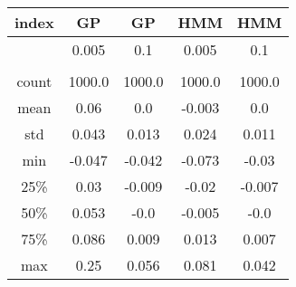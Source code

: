 \centering \begin{tabular}{c|c|c|c|c}
index	&GP	&GP	&HMM	&HMM\\\hline
	&0.005	&0.1	&0.005	&0.1\\
	&	&	&	&\\
count	&1000.0	&1000.0	&1000.0	&1000.0\\
mean	&0.06	&0.0	&-0.003	&0.0\\
std	&0.043	&0.013	&0.024	&0.011\\
min	&-0.047	&-0.042	&-0.073	&-0.03\\
25\%	&0.03	&-0.009	&-0.02	&-0.007\\
50\%	&0.053	&-0.0	&-0.005	&-0.0\\
75\%	&0.086	&0.009	&0.013	&0.007\\
max	&0.25	&0.056	&0.081	&0.042\\
\end{tabular}
